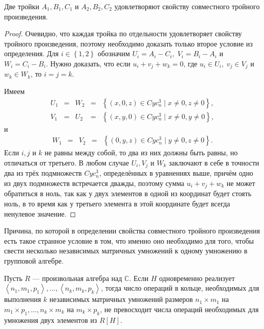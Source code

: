 \begin{prop}\label{prop:05:5.2}
  Две тройки $A_1,B_1,C_1$ и $A_2,B_2,C_2$ удовлетворяют свойству совместного тройного произведения.
\end{prop}
\begin{proof}
	Очевидно, что каждая тройка по отдельности удовлетворяет свойству тройного произведения, поэтому необходимо доказать только второе условие из определения. Для $i \in \left\{ 1,2 \right\}$ обозначим $U_i=A_i-C_i,\; V_i=B_i-A_i$ и $W_i=C_i-B_i$. Нужно доказать, что если $u_i+v_j+w_k=0$, где $u_i \in U_i,\; v_j \in V_j$ и $w_k \in W_k$, то $i=j=k$.

	Имеем 
	\[
		\begin{array}{lclcl}
			U_1 & = & W_2 & = & \left\{ (x,0,z) \in Cyc_n^3 \mid x \neq 0, z \neq 0 \right\}, \\
			V_1 & = & U_2 & = & \left\{ (x,y,0) \in Cyc_n^3 \mid x \neq 0, y \neq 0 \right\}, 
		\end{array}
	\]
	и
	\[
		\begin{array}{lclcl}
			W_1 & = & V_2 & = & \left\{ (0,y,z) \in Cyc_n^3 \mid y \neq 0, z \neq 0 \right\}.
		\end{array}
	\]
	Если $i,j$ и $k$ не равны между собой, то два из них должны быть равны, но отличаться от третьего. В любом случае $U_i, V_j$ и $W_k$ заключают в себе в точности два из трёх подмножеств $Cyc_n^3$, определённых в уравнениях выше, причём одно из двух подмножеств встречается дважды, поэтому сумма $u_i+v_j+w_k$ не может обратиться в ноль, так как у двух элементов в одной из координат будет стоять ноль, в то время как у третьего элемента в этой координате будет всегда ненулевое значение. 
\end{proof}

Причина, по которой в определении свойства совместного тройного произведения есть такое странное условие в том, что именно оно необходимо для того, чтобы свести несколько независимых матричных умножений к одному умножению в групповой алгебре.

\begin{theorem}
  \label{th:05:5.3} Пусть $R$ --- произвольная алгебра над $\mathbb{C}$. Если $H$ одновременно реализует $\left\langle n_1,m_1,p_1  \right\rangle , \dotsc, \left\langle n_k,m_k,p_k \right\rangle$, тогда число операций в кольце, необходимых для выполнения $k$ независимых матричных умножений размеров $n_1 \times m_1$ на $m_1 \times p_1, \dotsc, n_k \times m_k$ на $m_k \times p_k$, не превосходит числа операций необходимых для умножения двух элементов из $R[H]$.
\end{theorem}
  
